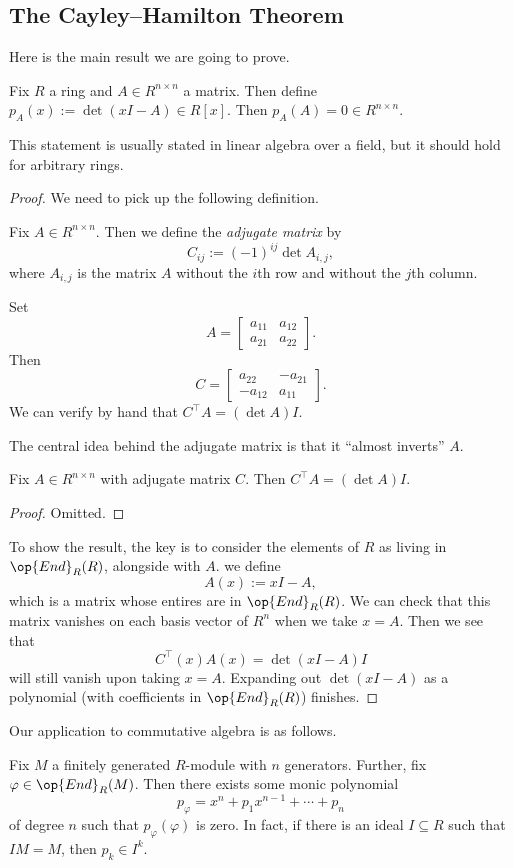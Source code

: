 \subsection{The Cayley--Hamilton Theorem}
Here is the main result we are going to prove.
\begin{theorem}
	Fix $R$ a ring and $A\in R^{n\times n}$ a matrix. Then define $p_A(x):=\det(xI-A)\in R[x]$. Then $p_A(A)=0\in R^{n\times n}$.
\end{theorem}
This statement is usually stated in linear algebra over a field, but it should hold for arbitrary rings.
\begin{proof}
	We need to pick up the following definition.
	\begin{definition}
		Fix $A\in R^{n\times n}$. Then we define the \textit{adjugate matrix} by
		\[C_{ij}:=(-1)^{ij}\det A_{i,j},\]
		where $A_{i,j}$ is the matrix $A$ without the $i$th row and without the $j$th column.
	\end{definition}
	\begin{example}
		Set
		\[A=\begin{bmatrix}
			a_{11} & a_{12} \\
			a_{21} & a_{22}
		\end{bmatrix}.\]
		Then
		\[C=\begin{bmatrix}
			a_{22} & -a_{21} \\
			-a_{12} & a_{11}
		\end{bmatrix}.\]
		We can verify by hand that $C^\intercal A=(\det A)I$.
	\end{example}
	The central idea behind the adjugate matrix is that it ``almost inverts'' $A$.
	\begin{lemma}
		Fix $A\in R^{n\times n}$ with adjugate matrix $C$. Then $C^\intercal A=(\det A)I$.
	\end{lemma}
	\begin{proof}
		Omitted.
	\end{proof}
	To show the result, the key is to consider the elements of $R$ as living in $\op{End}_R(R)$, alongside with $A$. we define
	\[A(x):=xI-A,\]
	which is a matrix whose entires are in $\op{End}_R(R)$. We can check that this matrix vanishes on each basis vector of $R^n$ when we take $x=A$. Then we see that
	\[C^\intercal(x)A(x)=\det(xI-A)I\]
	will still vanish upon taking $x=A$. Expanding out $\det(xI-A)$ as a polynomial (with coefficients in $\op{End}_R(R)$) finishes.
\end{proof}
Our application to commutative algebra is as follows.
\begin{theorem} \label{thm:betterch}
	Fix $M$ a finitely generated $R$-module with $n$ generators. Further, fix $\varphi\in\op{End}_R(M)$. Then there exists some monic polynomial
	\[p_\varphi=x^n+p_1x^{n-1}+\cdots+p_n\]
	of degree $n$ such that $p_\varphi(\varphi)$ is zero. In fact, if there is an ideal $I\subseteq R$ such that $IM=M$, then $p_k\in I^k$.
\end{theorem}
